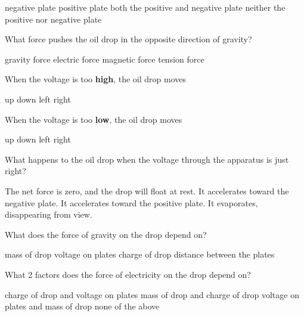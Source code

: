 \documentclass[]{exam}
\begin{document}
\begin{questions}
\begin{randomizechoices}
    \correctchoice negative plate
    \choice positive plate
    \choice both the positive and negative plate
    \choice neither the positive nor negative plate
\end{randomizechoices}

\question
What force pushes the oil drop in the opposite direction of gravity?

\begin{randomizechoices}
    \choice gravity force
    \correctchoice electric force
    \choice magnetic force
    \choice tension force
\end{randomizechoices}

\question
When the voltage is too \textbf{high}, the oil drop moves

\begin{randomizechoices}
    \correctchoice up
    \choice down
    \choice left
    \choice right
\end{randomizechoices}

\question
When the voltage is too \textbf{low}, the oil drop moves

\begin{randomizechoices}
    \choice up
    \correctchoice down
    \choice left
    \choice right
\end{randomizechoices}

\question
What happens to the oil drop when the voltage through the apparatus is just right?

\begin{randomizechoices}
    \correctchoice The net force is zero, and the drop will float at rest.
    \choice It accelerates toward the negative plate.
    \choice It accelerates toward the positive plate.
    \choice It evaporates, disappearing from view.
\end{randomizechoices}

\question
What does the force of gravity on the drop depend on?

\begin{randomizechoices}
    \correctchoice mass of drop
    \choice voltage on plates
    \choice charge of drop
    \choice distance between the plates
\end{randomizechoices}

\question
What 2 factors does the force of electricity on the drop depend on?

\begin{randomizechoices}[keeplast]
    \correctchoice charge of drop and voltage on plates
    \choice mass of drop and charge of drop
    \choice voltage on plates and mass of drop
    \choice none of the above
\end{randomizechoices}


\end{questions}
\end{document}
